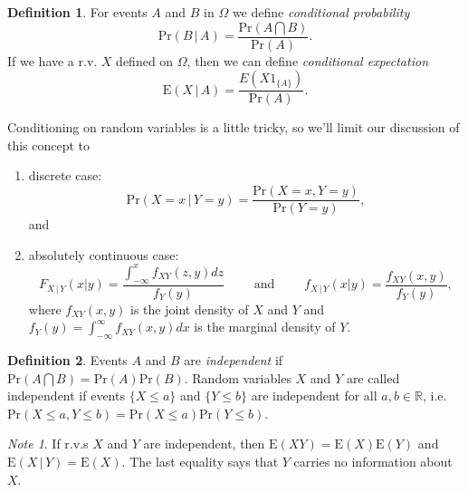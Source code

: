 \documentclass[11pt]{article}\usepackage[]{graphicx}\usepackage[]{color}
\numberwithin{algorithm}{section}
\newcommand{\cprob}[2]{\ensuremath{\text{Pr}\left(#1 \,|\,#2\right)}}
\newcommand{\prob}[1]{\ensuremath{\text{Pr}\left(#1 \right)}}
\newcommand{\cexpect}[4]{\ensuremath{\text{E}\left#3 #1 \,|\,#2\right#4}}
\newcommand{\expect}[3]{\ensuremath{\text{E}\left#2 #1 \right#3}}
\newcommand{\indfun}[1]{\ensuremath{1_{\{#1\}}}}
\theoremstyle{remark}
\newtheorem*{mynote}{Note}
\theoremstyle{definition}
\newtheorem*{define}{Definition}
\begin{document}
\begin{define}
  For events $A$ and $B$ in $\Omega$ we define \textit{conditional probability} 
  \[
  \cprob{B}{A} = \frac{\prob{A \bigcap B}}{\prob{A}}.
  \]
  If we have a r.v. $X$ defined on $\Omega$, then we can define \textit{conditional expectation}
  \[
  \cexpect{X}{A}{(}{)} = \frac{E(X \indfun{A})}{\prob{A}}.
  \]
\end{define}
Conditioning on random variables is a little tricky, so we'll limit our discussion of this concept to 
\begin{enumerate}
\item discrete case: 
\[
\cprob{X=x}{Y=y} = \frac{\prob{X=x,Y=y}}{\prob{Y=y}},
\]
and
\item absolutely continuous case: 
\[
F_{X\,|\,Y}(x|y) = \frac{\int_{-\infty}^x f_{XY}(z,y)dz}{f_Y(y)} 
\qquad \text{ and } \qquad  
f_{X\,|\,Y}(x|y) = \frac{f_{XY}(x,y)}{f_Y(y)}, 
\]
where $f_{XY}(x,y)$ is the joint density of 
  $X$ and $Y$ and $f_Y(y) = \int_{-\infty}^{\infty} f_{XY}(x,y) dx$ is the marginal density of $Y$.
\end{enumerate}

\begin{define}
  Events $A$ and $B$ are \textit{independent} if $\prob{A \bigcap B} = \prob{A} \prob{B}$. Random variables
  $X$ and $Y$ are called independent if events $\{X \le a\}$ and $\{Y \le b\}$ are independent 
  for all $a,b \in \mathbb{R}$, i.e. $\prob{X \le a, Y \le b} = \prob{X \le a} \prob{Y \le b}$. 
\end{define}

\begin{mynote}
  If r.v.s $X$ and $Y$ are independent, then $\expect{X Y}{(}{)} = \expect{X}{(}{)} \expect{Y}{(}{)}$
  and $\cexpect{X}{Y}{(}{)} = \expect{X}{(}{)}$. The last equality says that $Y$ carries no information 
  about $X$.
\end{mynote}
\end{document}
